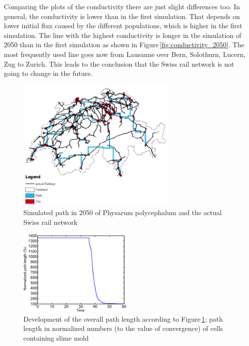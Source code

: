 \documentclass[11pt]{scrartcl}
\begin{document}
Comparing the plots of the conductivity there are just slight differences too. In general, the conductivity is lower than in the first simulation. That depends on lower initial flux caused by the different populations, which is higher in the first simulation. The line with the highest conductivity is longer in the simulation of 2050 than in the first simulation as shown in Figure\,\ref{fig:conductivity_2050}. The most frequently used line goes now from Lausanne over Bern, Solothurn, Lucern, Zug to Zurich. This leads to the conclusion that the Swiss rail network is not going to change in the future.

\begin{figure}[H]
	\centering
	\includegraphics[width=0.7\textwidth]{figures/path_railway_2050}
	\caption{Simulated path in 2050 of Physarum polycephalum and the actual Swiss rail network}
	\label{fig:path_2050}
\end{figure}

\begin{figure}[H]
	\centering
	\includegraphics[width=0.5\textwidth]{figures/plottrail2}
	\caption{Development of the overall path length according to Figure\,\ref{fig:path_2050}; path length in normalized numbers (to the value of convergence) of cells containing slime mold}
	\label{fig:plottrail_2050}
\end{figure}
\end{document}
